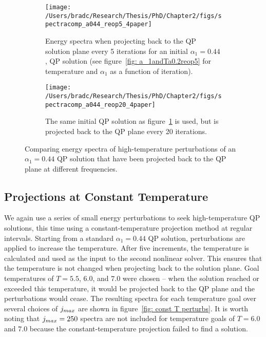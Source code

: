\documentclass[../PhD.tex]{subfiles}
\begin{document}
\begin{figure}[h]
	\centering
	\begin{subfigure}[t]{0.45\textwidth}
		\texttt{[image: /Users/bradc/Research/Thesis/PhD/Chapter2/figs/spectracomp\_a044\_reop5\_4paper]}
		\caption{Energy spectra when projecting back to the QP solution plane every 5 iterations for an initial $\alpha_1 = 0.44$, QP solution (see figure~\ref{fig: a_1andTa0.2reop5} for temperature and $\alpha_1$ as a function of iteration).}
		\label{fig: spec comparisons reop5}
	\end{subfigure}
	\:
	\begin{subfigure}[t]{0.45\textwidth}
		\texttt{[image: /Users/bradc/Research/Thesis/PhD/Chapter2/figs/spectracomp\_a044\_reop20\_4paper]}
		\caption{The same initial QP solution as figure~\ref{fig: spec comparisons reop5} is used, but is projected back to the QP plane every 20 iterations.}
		\label{fig: spec comparisons reop20}
	\end{subfigure}
	\caption[Energy spectra resulting from perturbing the same QP solution at differing frequencies]{Comparing energy spectra of high-temperature perturbations of an $\alpha_1=0.44$ QP solution that have been projected back to the QP plane at different frequencies.}
	\label{fig: spec comps with reop}
\end{figure}



\subsection{Projections at Constant Temperature}
\label{ssec: T projections}

We again use a series of small energy perturbations to seek high-temperature QP solutions, this time using a constant-temperature projection method at regular intervals. Starting from a standard $\alpha_1 = 0.44$ QP solution, perturbations are applied to increase the temperature. After five increments, the temperature is calculated and used as the input to the second nonlinear solver. This ensures that the temperature is not changed when projecting back to the solution plane. Goal temperatures of $T=5.5$, $6.0$, and $7.0$ were chosen -- when the solution reached or exceeded this temperature, it would be projected back to the QP plane and the perturbations would cease. The resulting spectra for each temperature goal over several choices of $j_{max}$ are shown in figure~\ref{fig: const T perturbs}. It is worth noting that $j_{max} = 250$ spectra are not included for temperature goals of $T=6.0$ and $7.0$ because the constant-temperature projection failed to find a solution.
\end{document}
